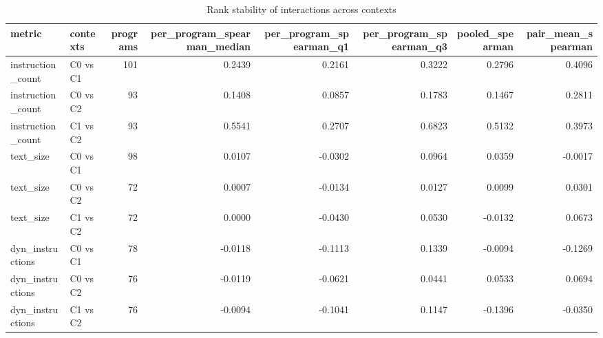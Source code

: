 \begin{table}[t]
\centering
\caption{Rank stability of interactions across contexts}
\label{tab:rq1-context-stability}
\begin{tabular}{llrrrrrr}
\toprule
metric & contexts & programs & per\_program\_spearman\_median & per\_program\_spearman\_q1 & per\_program\_spearman\_q3 & pooled\_spearman & pair\_mean\_spearman \\
\midrule
instruction\_count & C0 vs C1 & 101 & 0.2439 & 0.2161 & 0.3222 & 0.2796 & 0.4096 \\
instruction\_count & C0 vs C2 & 93 & 0.1408 & 0.0857 & 0.1783 & 0.1467 & 0.2811 \\
instruction\_count & C1 vs C2 & 93 & 0.5541 & 0.2707 & 0.6823 & 0.5132 & 0.3973 \\
text\_size & C0 vs C1 & 98 & 0.0107 & -0.0302 & 0.0964 & 0.0359 & -0.0017 \\
text\_size & C0 vs C2 & 72 & 0.0007 & -0.0134 & 0.0127 & 0.0099 & 0.0301 \\
text\_size & C1 vs C2 & 72 & 0.0000 & -0.0430 & 0.0530 & -0.0132 & 0.0673 \\
dyn\_instructions & C0 vs C1 & 78 & -0.0118 & -0.1113 & 0.1339 & -0.0094 & -0.1269 \\
dyn\_instructions & C0 vs C2 & 76 & -0.0119 & -0.0621 & 0.0441 & 0.0533 & 0.0694 \\
dyn\_instructions & C1 vs C2 & 76 & -0.0094 & -0.1041 & 0.1147 & -0.1396 & -0.0350 \\
\bottomrule
\end{tabular}
\end{table}
